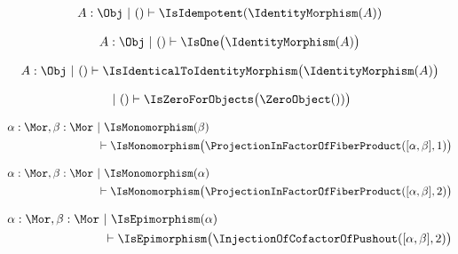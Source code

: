 \begin{sequent}
\begin{align*}
  A:\Obj ~|~ () \vdash \IsIdempotent( \IdentityMorphism( A ) )
\end{align*}
\end{sequent}

\begin{sequent}
 \begin{align*}
  A:\Obj ~|~ () \vdash \IsOne\big( \IdentityMorphism( A ) \big)
 \end{align*}
\end{sequent}

\begin{sequent}
 \begin{align*}
  A:\Obj ~|~ () \vdash \IsIdenticalToIdentityMorphism\big( \IdentityMorphism( A ) \big)
 \end{align*}
\end{sequent}

\begin{sequent}
 \begin{align*}
   ~|~ () \vdash \IsZeroForObjects\big( \ZeroObject() ) \big)
 \end{align*}
\end{sequent}

\begin{sequent}
\begin{align*}
  \alpha:\Mor, \beta:\Mor  ~&|~ \IsMonomorphism( \beta ) \\
  &\vdash \IsMonomorphism\big( \ProjectionInFactorOfFiberProduct( [\alpha, \beta], 1 ) \big)
\end{align*}
\end{sequent}

\begin{sequent}
\begin{align*}
  \alpha:\Mor, \beta:\Mor ~&|~ \IsMonomorphism( \alpha ) \\
  &\vdash \IsMonomorphism\big( \ProjectionInFactorOfFiberProduct( [\alpha, \beta], 2 ) \big)
\end{align*}
\end{sequent}

\begin{sequent}
\begin{align*}
  \alpha:\Mor, \beta:\Mor ~&|~ \IsEpimorphism( \alpha ) \\
  &\vdash \IsEpimorphism\big( \InjectionOfCofactorOfPushout( [\alpha, \beta], 2 ) \big)
\end{align*}
\end{sequent}

